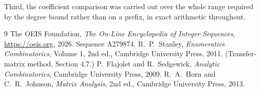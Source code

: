 \documentclass[11pt,a4paper]{article}
\theoremstyle{plain}
\theoremstyle{definition}
\begin{document}
Third, the coefficient comparison was carried out over the whole range required by the degree
bound rather than on a prefix, in exact arithmetic throughout.

\begin{thebibliography}{9}
 The OEIS Foundation, \emph{The On-Line Encyclopedia of Integer
Sequences}, \url{https://oeis.org}, 2026. Sequence A279874.
 R.~P.~Stanley, \emph{Enumerative Combinatorics}, Volume 1, 2nd ed.,
Cambridge University Press, 2011. (Transfer-matrix method, Section 4.7.)
 P.~Flajolet and R.~Sedgewick, \emph{Analytic Combinatorics}, Cambridge
University Press, 2009.
 R.~A.~Horn and C.~R.~Johnson, \emph{Matrix Analysis}, 2nd ed., Cambridge
University Press, 2013.
\end{thebibliography}
\end{document}
